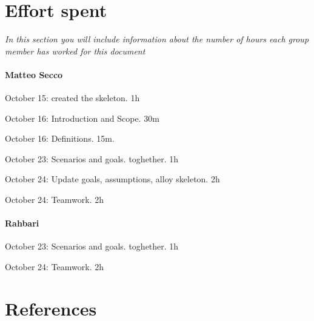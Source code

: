 \documentclass{article}
\begin{document}
\section{Effort spent} \textit{In this section you will include information about the number of hours each group member has worked for this document}
	\paragraph{Matteo Secco} 
		\begin{list}{-}{}
			\item October 15: created the skeleton. 1h
			\item October 16: Introduction and Scope. 30m
			\item October 16: Definitions. 15m.
			\item October 23: Scenarios and goals. toghether. 1h
			\item October 24: Update goals, assumptions, alloy skeleton. 2h
			\item October 24: Teamwork. 2h
		\end{list}
	\paragraph{Rahbari}
		\begin{list}{-}{}
			\item October 23: Scenarios and goals. toghether. 1h
			\item October 24: Teamwork. 2h
		\end{list}
\section{References}
\end{document}
